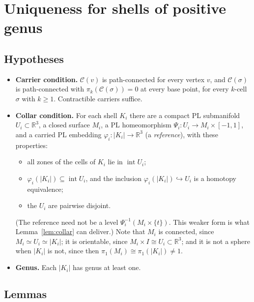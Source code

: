 \documentclass[preprint,12pt]{elsarticle}
\theoremstyle{definition}
\theoremstyle{remark}
\newcommand{\R}{\mathbb{R}}
\newcommand{\C}{\mathcal{C}}
\newcommand{\inter}{\operatorname{int}}
\begin{document}
\section{Uniqueness for shells of positive genus}\label{sec:uniqueness}

\subsection{Hypotheses}
\begin{itemize}
\item \textbf{Carrier condition.} $\C(v)$ is path-connected for every vertex $v$, and $\C(\sigma)$ is path-connected
with $\pi_k(\C(\sigma))=0$ at every base point, for every $k$-cell $\sigma$ with $k\ge1$. Contractible carriers suffice.
\item \textbf{Collar condition.} For each shell $K_i$ there are a compact PL submanifold $U_i\subset\R^3$, a
closed surface $M_i$, a PL homeomorphism $\Psi_i\colon U_i\to M_i\times[-1,1]$, and a carried PL embedding
$\varphi_i\colon|K_i|\to\R^3$ (a \emph{reference}), with these properties:
  \begin{itemize}
  \item all zones of the cells of $K_i$ lie in $\inter U_i$;
  \item $\varphi_i(|K_i|)\subseteq\inter U_i$, and the inclusion $\varphi_i(|K_i|)\hookrightarrow U_i$ is a homotopy
  equivalence;
  \item the $U_i$ are pairwise disjoint.
  \end{itemize}
  (The reference need not be a level $\Psi_i^{-1}(M_i\times\{t\})$. This weaker form is what
  Lemma~\ref{lem:collar} can deliver.) Note that $M_i$ is connected, since $M_i\simeq U_i\simeq|K_i|$; it is
  orientable, since $M_i\times I\cong U_i\subset\R^3$; and it is not a sphere when $|K_i|$ is not, since then $\pi_1(M_i)\cong\pi_1(|K_i|)\ne1$.
\item \textbf{Genus.} Each $|K_i|$ has genus at least one.
\end{itemize}

\subsection{Lemmas}
\end{document}
